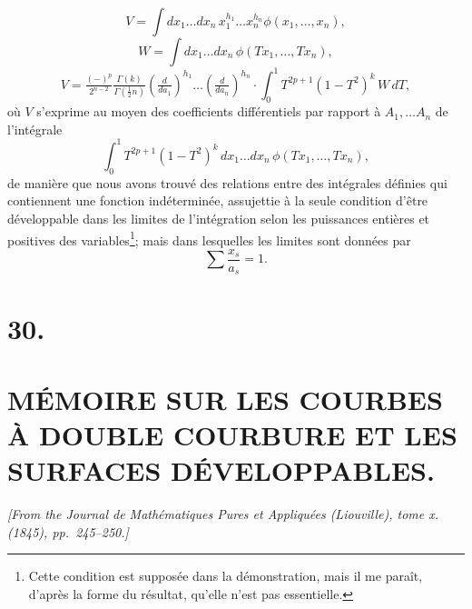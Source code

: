 \documentclass[11pt]{article}
\begin{document}
\[
V = \int dx_1 \ldots dx_n\, x_1^{h_1} \ldots x_n^{h_n} \phi(x_1, \ldots, x_n),
\]
\[
W = \int dx_1 \ldots dx_n\, \phi(Tx_1, \ldots, Tx_n),
\]
\[
V = \tfrac{(-)^p}{2^{n-2}} \tfrac{\Gamma(k)}{\Gamma(\tfrac12 n)}\!\left(\tfrac{d}{da_1}\right)^{\!h_1}\!\!\ldots\!\left(\tfrac{d}{da_n}\right)^{\!h_n}\!\!\cdot\!\int_0^1 T^{2p+1}(1-T^2)^{k}\,W\,dT,
\]
o\`u $V$ s'exprime au moyen des coefficients diff\'erentiels par rapport \`a $A_1, \ldots A_n$ de l'int\'egrale
\[
\int_0^1 T^{2p+1}(1-T^2)^{k}\,dx_1\ldots dx_n\, \phi(Tx_1, \ldots, Tx_n),
\]
de mani\`ere que nous avons trouv\'e des relations entre des int\'egrales d\'efinies qui contiennent une fonction ind\'etermin\'ee, assujettie \`a la seule condition d'\^etre d\'eveloppable dans les limites de l'int\'egration selon les puissances enti\`eres et positives des variables\footnote{Cette condition est suppos\'ee dans la d\'emonstration, mais il me para\^it, d'apr\`es la forme du r\'esultat, qu'elle n'est pas essentielle.}; mais dans lesquelles les limites sont donn\'ees par
\[
\sum \frac{x_s}{a_s} = 1.
\]

\newpage
\section*{30.}
\section*{M\'EMOIRE SUR LES COURBES \`A DOUBLE COURBURE ET LES SURFACES D\'EVELOPPABLES.}

\textit{[From the Journal de Math\'ematiques Pures et Appliqu\'ees (Liouville), tome x. (1845), pp.~245--250.]}

\bigskip
\setcounter{page}{207}
\end{document}
